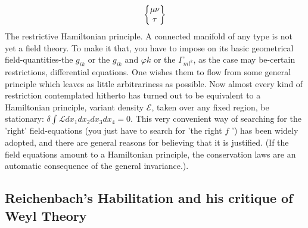 \documentclass[draft]{article}
\begin{document}
\begin{equation*}
\begin{Bmatrix} \mu \nu \\ \tau \end{Bmatrix}
\end{equation*}
%
The restrictive Hamiltonian principle. A connected manifold of any type is not yet a field theory. To make it that, you have to impose on its basic geometrical field-quantities-the $g_{i k}$ or the $g_{i k}$ and $\varphi k$ or the $\Gamma_{m l^{k}}$, as the case may be-certain restrictions, differential equations. One wishes them to flow from some general principle which leaves as little arbitrariness as possible. Now almost every kind of restriction contemplated hitherto has turned out to be equivalent to a Hamiltonian principle, variant density $\mathcal{E}$, taken over any fixed region, be stationary:
$\delta \int \mathcal{L} d x_{1} d x_{2} d x_{3} d x_{4}=0$. This very convenient way of searching for the 'right' field-equations (you just have to search for 'the right $f$ ') has been widely adopted, and there are general reasons for believing that it is justified. (If the field equations amount to a Hamiltonian principle, the conservation laws are an automatic consequence of the general invariance.). 



\subsection{Reichenbach's Habilitation and his critique of Weyl Theory}
\end{document}
